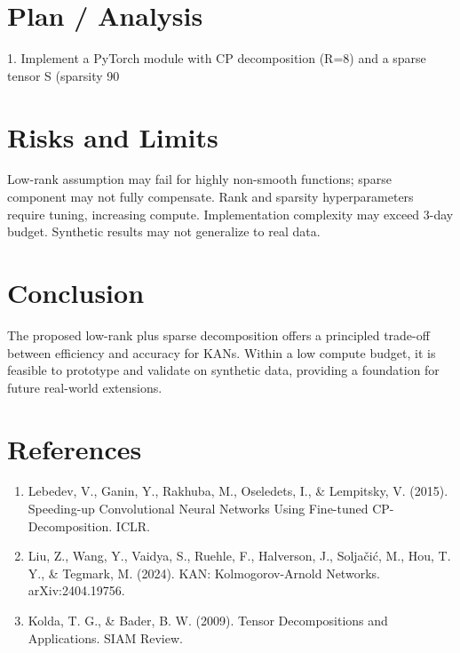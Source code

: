 \documentclass[10pt]{article}
\begin{document}
\section*{Plan / Analysis}
1. Implement a PyTorch module with CP decomposition (R=8) and a sparse tensor S (sparsity 90%

\section*{Risks and Limits}
Low-rank assumption may fail for highly non-smooth functions; sparse component may not fully compensate. Rank and sparsity hyperparameters require tuning, increasing compute. Implementation complexity may exceed 3-day budget. Synthetic results may not generalize to real data.

\section*{Conclusion}
The proposed low-rank plus sparse decomposition offers a principled trade-off between efficiency and accuracy for KANs. Within a low compute budget, it is feasible to prototype and validate on synthetic data, providing a foundation for future real-world extensions.

\section*{References}
\begin{enumerate}[leftmargin=*]
\item Lebedev, V., Ganin, Y., Rakhuba, M., Oseledets, I., \& Lempitsky, V. (2015). Speeding-up Convolutional Neural Networks Using Fine-tuned CP-Decomposition. ICLR.
\item Liu, Z., Wang, Y., Vaidya, S., Ruehle, F., Halverson, J., Soljačić, M., Hou, T. Y., \& Tegmark, M. (2024). KAN: Kolmogorov-Arnold Networks. arXiv:2404.19756.
\item Kolda, T. G., \& Bader, B. W. (2009). Tensor Decompositions and Applications. SIAM Review.
\end{enumerate}
\end{document}
